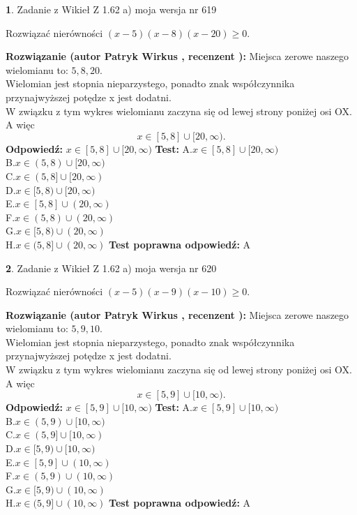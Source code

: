 \documentclass[12pt, a4paper]{article}
\theoremstyle{definition} %
\newtheorem{zad}{}
\newcommand{\zadStart}[1]{\begin{zad}#1\newline}
\newcommand{\zadStop}{\end{zad}}
\newcommand{\rozwStart}[2]{\noindent \textbf{Rozwiązanie (autor #1 , recenzent #2): }\newline}
\newcommand{\rozwStop}{\newline}
\newcommand{\odpStart}{\noindent \textbf{Odpowiedź:}\newline}
\newcommand{\odpStop}{\newline}
\newcommand{\testStart}{\noindent \textbf{Test:}\newline}
\newcommand{\testStop}{\newline}
\newcommand{\kluczStart}{\noindent \textbf{Test poprawna odpowiedź:}\newline}
\newcommand{\kluczStop}{\newline}
\begin{document}
\zadStart{Zadanie z Wikieł Z 1.62 a) moja wersja nr 619}

Rozwiązać nierówności $(x-5)(x-8)(x-20)\ge0$.
\zadStop
\rozwStart{Patryk Wirkus}{}
Miejsca zerowe naszego wielomianu to: $5, 8, 20$.\\
Wielomian jest stopnia nieparzystego, ponadto znak współczynnika przy\linebreak najwyższej potędze x jest dodatni.\\ W związku z tym wykres wielomianu zaczyna się od lewej strony poniżej osi OX. A więc $$x \in [5,8] \cup [20,\infty).$$
\rozwStop
\odpStart
$x \in [5,8] \cup [20,\infty)$
\odpStop
\testStart
A.$x \in [5,8] \cup [20,\infty)$\\
B.$x \in (5,8) \cup [20,\infty)$\\
C.$x \in (5,8] \cup [20,\infty)$\\
D.$x \in [5,8) \cup [20,\infty)$\\
E.$x \in [5,8] \cup (20,\infty)$\\
F.$x \in (5,8) \cup (20,\infty)$\\
G.$x \in [5,8) \cup (20,\infty)$\\
H.$x \in (5,8] \cup (20,\infty)$
\testStop
\kluczStart
A
\kluczStop



\zadStart{Zadanie z Wikieł Z 1.62 a) moja wersja nr 620}

Rozwiązać nierówności $(x-5)(x-9)(x-10)\ge0$.
\zadStop
\rozwStart{Patryk Wirkus}{}
Miejsca zerowe naszego wielomianu to: $5, 9, 10$.\\
Wielomian jest stopnia nieparzystego, ponadto znak współczynnika przy\linebreak najwyższej potędze x jest dodatni.\\ W związku z tym wykres wielomianu zaczyna się od lewej strony poniżej osi OX. A więc $$x \in [5,9] \cup [10,\infty).$$
\rozwStop
\odpStart
$x \in [5,9] \cup [10,\infty)$
\odpStop
\testStart
A.$x \in [5,9] \cup [10,\infty)$\\
B.$x \in (5,9) \cup [10,\infty)$\\
C.$x \in (5,9] \cup [10,\infty)$\\
D.$x \in [5,9) \cup [10,\infty)$\\
E.$x \in [5,9] \cup (10,\infty)$\\
F.$x \in (5,9) \cup (10,\infty)$\\
G.$x \in [5,9) \cup (10,\infty)$\\
H.$x \in (5,9] \cup (10,\infty)$
\testStop
\kluczStart
A
\kluczStop
\end{document}
